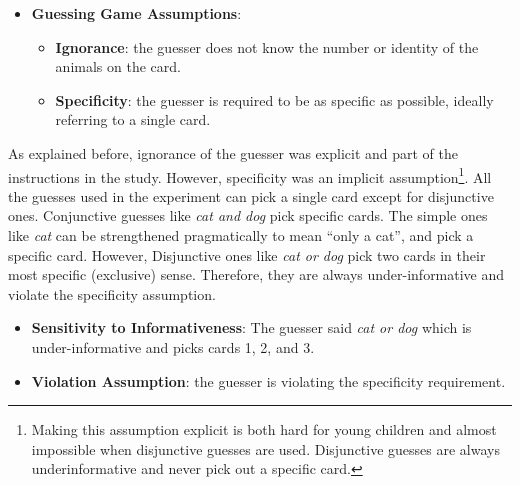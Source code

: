 \documentclass[floatsintext,man]{apa6}
\providecommand{\tightlist}{%
  \setlength{\itemsep}{0pt}\setlength{\parskip}{0pt}}
\theoremstyle{definition}
\theoremstyle{definition}
\theoremstyle{definition}
\theoremstyle{remark}
\begin{document}
\begin{itemize}
\tightlist
\item
  \textbf{Guessing Game Assumptions}:

  \begin{itemize}
  \tightlist
  \item
    \textbf{Ignorance}: the guesser does not know the number or identity
    of the animals on the card.
  \item
    \textbf{Specificity}: the guesser is required to be as specific as
    possible, ideally referring to a single card.
  \end{itemize}
\end{itemize}

As explained before, ignorance of the guesser was explicit and part of
the instructions in the study. However, specificity was an implicit
assumption\footnote{Making this assumption explicit is both hard for
  young children and almost impossible when disjunctive guesses are
  used. Disjunctive guesses are always underinformative and never pick
  out a specific card.}. All the guesses used in the experiment can pick
a single card except for disjunctive ones. Conjunctive guesses like
\emph{cat and dog} pick specific cards. The simple ones like \emph{cat}
can be strengthened pragmatically to mean \enquote{only a cat}, and pick
a specific card. However, Disjunctive ones like \emph{cat or dog} pick
two cards in their most specific (exclusive) sense. Therefore, they are
always under-informative and violate the specificity assumption.

\begin{itemize}
\item
  \textbf{Sensitivity to Informativeness}: The guesser said \emph{cat or
  dog} which is under-informative and picks cards 1, 2, and 3.
\item
  \textbf{Violation Assumption}: the guesser is violating the
  specificity requirement.
\end{itemize}
\end{document}
